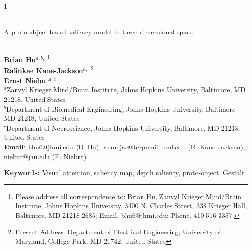 \documentclass[12pt]{article}
\renewcommand{\thefootnote}{\normalsize \arabic{footnote}}
\begin{document}
\hspace{13.9cm}1

\ \vspace{20mm}\\

{\LARGE A proto-object based saliency model in three-dimensional space}

\ \\
{\bf \large Brian Hu$^{\displaystyle a, \displaystyle b, }$}
\footnote[1]{Please address all correspondence to: Brian Hu, Zanvyl Krieger Mind/Brain Institute, Johns Hopkins University, 3400 N. Charles Street, 338 Krieger Hall, Baltimore, MD 21218-2685; Email, bhu6@jhmi.edu; Phone, 410-516-3357.}\\
{\bf \large Ralinkae Kane-Jackson$^{\displaystyle a, }$}
\footnote[2]{Present Address: Department of Electrical Engineering, University of Maryland, College Park, MD 20742, United States}\\
{\bf \large Ernst Niebur$^{\displaystyle a, \displaystyle c}$}\\
{$^{\displaystyle a}$Zanvyl Krieger Mind/Brain Institute, Johns Hopkins University, Baltimore, MD 21218, United States}\\
{$^{\displaystyle b}$Department of Biomedical Engineering, Johns Hopkins University, Baltimore, MD 21218, United States}\\
{$^{\displaystyle c}$Department of Neuroscience, Johns Hopkins University, Baltimore, MD 21218, United States}\\
{\bf Email:} bhu6@jhmi.edu (B. Hu), rkanejac@terpmail.umd.edu (R. Kane-Jackson), niebur@jhu.edu (E. Niebur)\\

\renewcommand{\thefootnote}{\normalsize \arabic{footnote}} 	

{\bf Keywords:} Visual attention, saliency map, depth saliency,
proto-object, Gestalt
\clearpage

\thispagestyle{empty}
\end{document}
